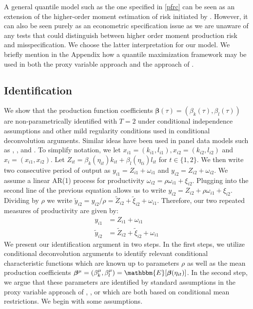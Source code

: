 \documentclass[11pt]{article}
\begin{document}
A general quantile model such as the one specified in \eqref{pfrc} can be seen as an extension of the higher-order moment estimation of risk initiated by \cite{Antle1983}. However, it can also be seen purely as an econometric specification issue as we are unaware of any tests that could distinguish between higher order moment production risk and misspecification. We choose the latter interpretation for our model. We briefly mention in the Appendix how a quantile maximization framework may be used in both the proxy variable approach and the approach of \cite{Gandhi2020}.

\subsection{Identification}

We show that the production function coefficients $\boldsymbol{\beta}(\tau)=(\beta_{k}(\tau), \beta_{l}(\tau))$ are non-parametrically identified with $T=2$ under conditional independence assumptions and other mild regularity conditions used in conditional deconvolution arguments. Similar ideas have been used in panel data models such as \cite{Canay2011}, \cite{Neumann2007}, and \cite{evdo2010}. To simplify notation, we let $x_{i1}=(k_{i1}, l_{i1}), x_{i2}=(k_{i2}, l_{i2})$ and $x_{i}=(x_{i1}, x_{i2})$. Let $Z_{it}=\beta_{k}(\eta_{it})k_{it}+\beta_{l}(\eta_{ti})l_{it}$ for $t\in\{1,2\}$. We then write two consecutive period of output as $y_{i1}=Z_{i1}+\omega_{i1}$ and $y_{i2}=Z_{i2}+\omega_{i2}$. We assume a linear AR(1) process for productivity $\omega_{i2}=\rho\omega_{i1}+\xi_{i2}$. Plugging into the second line of the previous equation allows us to write $y_{i2}=Z_{i2}+\rho\omega_{i1}+\xi_{i2}$. Dividing by $\rho$ we write $\tilde{y}_{i2}=y_{i2}/\rho=\tilde{Z}_{i2}+\tilde{\xi}_{i2}+\omega_{i1}$. Therefore, our two repeated measures of productivity are given by:
\begin{equation} \label{repeatedmeas}
\begin{split}
y_{i1}&=Z_{i1}+\omega_{i1}\\
\tilde{y}_{i2}&=\tilde{Z}_{i2}+\tilde{\xi}_{i2}+\omega_{i1}
\end{split}
\end{equation}
 We present our identification argument in two steps. In the first steps, we utilize conditional deconvolution arguments to identify relevant conditional characteristic functions which are known up to parameters $\rho$ as well as the mean production coefficients $\boldsymbol{\beta}^{\mu}=(\beta_{k}^{\mu}, \beta_{l}^{\mu})=\mathbbm{E}[\boldsymbol{\beta}(\eta_{it})]$. In the second step, we argue that these parameters are identified by standard assumptions in the proxy variable approach of \cite{Olley1996}, \cite{Levinsohn2003}, or \cite{Ackerberg2015} which are both based on conditional mean restrictions. We begin with some assumptions.
\end{document}
